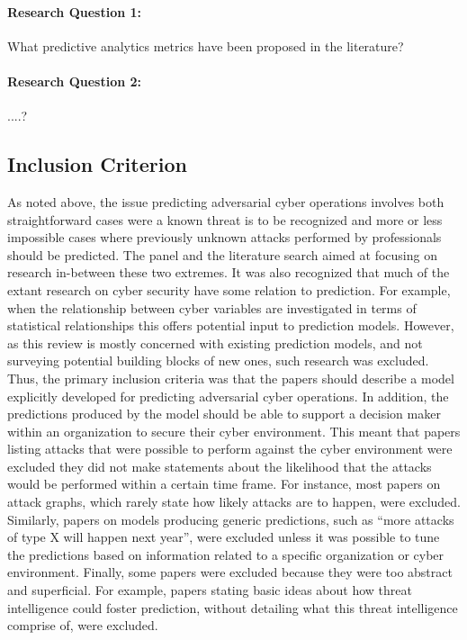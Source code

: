 \documentclass[acmsmall]{acmart}
\begin{document}
\paragraph{Research Question 1:} What predictive analytics metrics have been proposed in the literature?

\paragraph{Research Question 2:} ....?

\subsection{Inclusion Criterion}
As noted above, the issue predicting adversarial cyber operations involves both straightforward cases were a known threat is to be recognized and more or less impossible cases where previously unknown attacks performed by professionals should be predicted. The panel and the literature search aimed at focusing on research in-between these two extremes. It was also recognized that much of the extant research on cyber security have some relation to prediction. For example, when the relationship between cyber variables are investigated in terms of statistical relationships this offers potential input to prediction models. However, as this review is mostly concerned with existing prediction models, and not surveying potential building blocks of new ones, such research was excluded. Thus, the primary inclusion criteria was that the papers should describe a model explicitly developed for predicting adversarial cyber operations. 
In addition, the predictions produced by the model should be able to support a decision maker within an organization to secure their cyber environment. This meant that papers listing attacks that were possible to perform against the cyber environment were excluded they did not make statements about the likelihood that the attacks would be performed within a certain time frame. For instance, most papers on attack graphs, which rarely state how likely attacks are to happen, were excluded. Similarly, papers on models producing generic predictions, such as “more attacks of type X will happen next year”, were excluded unless it was possible to tune the predictions based on information related to a specific organization or cyber environment. Finally, some papers were excluded because they were too abstract and superficial.  For example, papers stating basic ideas about how threat intelligence could foster prediction, without detailing what this threat intelligence comprise of, were excluded.
\end{document}
